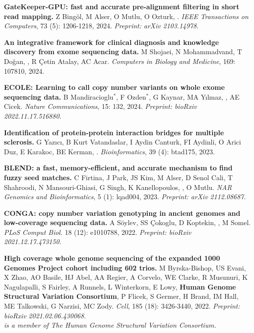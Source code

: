 \vspace{-.2cm}
    {\bf GateKeeper-GPU: fast and accurate pre-alignment filtering in short read mapping.}
    Z Bingöl, M Alser, O Mutlu, O Ozturk, \calkan{}.
    {\it IEEE Transactions on Computers}, 73 (5): 1206-1218, 2024.
    {\it Preprint: arXiv 2103.14978}.

\vspace{-.2cm}
    {\bf An integrative framework for clinical diagnosis and knowledge discovery from exome sequencing data.} M Shojaei, N Mohammadvand, T Doğan, \calkan{}, R Çetin Atalay, AC Acar.
    {\it Computers in Biology and Medicine}, 169: 107810, 2024.

\vspace{-.2cm}
    {\bf ECOLE: Learning to call copy number variants on whole exome sequencing data.} B Mandiracioglu$^\ast$,
    F Ozden$^\ast$, G Kaynar, MA Yılmaz, \calkan{}, AE Cicek.
    {\it Nature Communications}, 15: 132, 2024. \textit{Preprint: bioRxiv 2022.11.17.516880.}

\vspace{-.2cm}
    {\bf Identification of protein-protein interaction bridges for multiple sclerosis.} G Yazıcı, B Kurt Vatandaslar, I Aydin Canturk, FI Aydinli, O Arici Duz, E Karakoc, BE Kerman, \calkan{}. {\it Bioinformatics}, 39 (4): btad175, 2023.

\vspace{-.2cm}
    {\bf BLEND: a fast, memory-efficient, and accurate mechanism to find fuzzy seed matches.}
    C Firtina, J Park, JS Kim, M Alser, D Senol Cali, T Shahroodi, N Mansouri-Ghiasi, G Singh, K Kanellopoulos, \calkan{}, O Mutlu. {\it NAR Genomics and Bioinformatics}, 5 (1): lqad004, 2023.
    \textit{Preprint: arXiv 2112.08687.}

\vspace{-.2cm}
    {\bf CONGA: copy number variation genotyping in ancient genomes and low-coverage sequencing data.}  A Söylev, SS Çokoglu, D Koptekin, \calkan{}, M Somel.  
    {\it PLoS Comput Biol.} 18 (12): e1010788, 2022.
    \textit{Preprint: bioRxiv 2021.12.17.473150.}

\vspace{-.2cm}
    {\bf High coverage whole genome sequencing of the expanded 1000 Genomes Project cohort including 602 trios.}  M Byrska-Bishop, US Evani, X Zhao, AO Basile, HJ Abel, AA Regier, A Corvelo, WE Clarke, R Musunuri, K Nagulapalli, S Fairley, A Runnels, L Winterkorn, E Lowy, \textbf{Human Genome Structural Variation Consortium}, P Flicek, S Germer, H Brand, IM Hall, ME Talkowski,  G Narzisi, MC Zody. {\it Cell}, 185 (18): 3426-3440, 2022.
    \textit{Preprint: bioRxiv 2021.02.06.430068}.\\
    \hspace*{1cm}
    {\footnotesize \em \calkan{} is a member of The Human Genome Structural Variation Consortium.}


